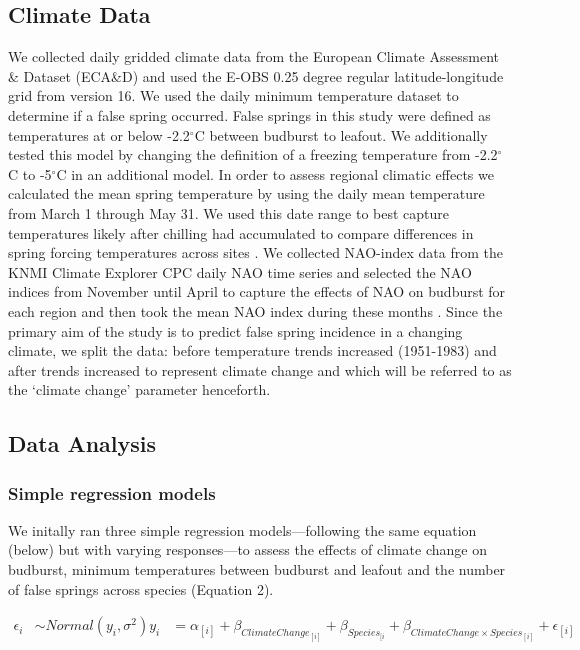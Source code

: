 \documentclass{article}\usepackage[]{graphicx}\usepackage[]{color}
\begin{document}
\subsection*{Climate Data}
We collected daily gridded climate data from the European Climate Assessment \& Dataset (ECA\&D) and used the E-OBS 0.25 degree regular latitude-longitude grid from version 16. We used the daily minimum temperature dataset to determine if a false spring occurred. False springs in this study were defined as temperatures at or below -2.2$^{\circ}$C \citep{Schwartz1993} between budburst to leafout. We additionally tested this model by changing the definition of a freezing temperature from -2.2$^{\circ}$C \citep{Schwartz1993} to -5$^{\circ}$C \citep{Lenz2013, Sakai1987} in an additional model. In order to assess regional climatic effects we calculated the mean spring temperature by using the daily mean temperature from March 1 through May 31. We used this date range to best capture temperatures likely after chilling had accumulated to compare differences in spring forcing temperatures across sites \citep{Basler2012, Korner2016}. We collected NAO-index data from the KNMI Climate Explorer CPC daily NAO time series and selected the NAO indices from November until April to capture the effects of NAO on budburst for each region and then took the mean NAO index during these months \citep{NAOdata}. Since the primary aim of the study is to predict false spring incidence in a changing climate, we split the data: before temperature trends increased (1951-1983) and after trends increased \citep[1984-2016,][]{Kharouba2018, Stocker2013} to represent climate change and which will be referred to as the `climate change' parameter henceforth.

\subsection*{Data Analysis} 
\subsubsection*{Simple regression models}
We initally ran three simple regression models---following the same equation (below) but with varying responses---to assess the effects of climate change on budburst, minimum temperatures between budburst and leafout and the number of false springs across species (Equation 2).

\begin{align*}
\epsilon_i & \sim Normal(y_i ,  \sigma^{2}) \tag{2}
y_i &= \alpha_{[i]} + \beta_{ClimateChange_{[i]}} + \beta_{Species_{[i}} + \beta_{ClimateChange \times Species_{[i]}} + \epsilon_{[i]} \nonumber\\
\end{align*}
\end{document}
